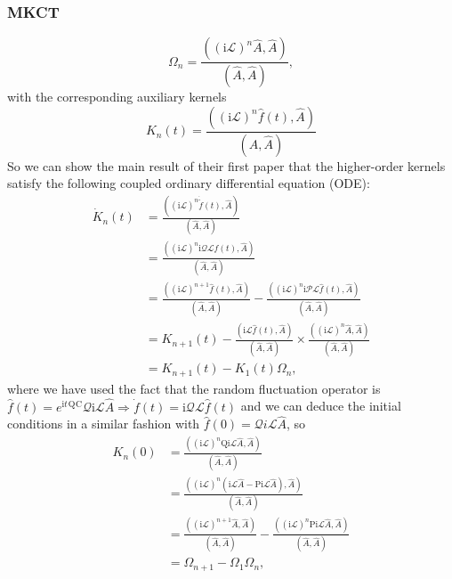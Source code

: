 \subsubsection{MKCT}
\begin{equation}
\Omega_n=\frac{\left((\mathrm{i} \mathcal{L})^n \hat{A}, \hat{A}\right)}{(\hat{A}, \hat{A})},
\end{equation}
with the corresponding auxiliary kernels
\begin{equation}
K_n(t)=\frac{\left((\mathrm{i} \mathcal{L})^n \hat{f}(t), \hat{A}\right)}{(\hat{A}, \hat{A})}
\end{equation}
So we can show the main result of their first paper that the higher-order kernels satisfy the following coupled ordinary differential equation (ODE):
\begin{align}
\dot{K}_n(t) & =\frac{\left((\mathrm{i} \mathcal{L})^n \dot{\tilde{f}}(t), \hat{A}\right)}{(\hat{A}, \hat{A})} \\
& =\frac{\left((\mathrm{i} \mathcal{L})^n \mathrm{i} \mathcal{Q} \mathcal{L} \hat{f}(t), \hat{A}\right)}{(\hat{A}, \hat{A})} \\
& =\frac{\left((\mathrm{i} \mathcal{L})^{n+1} \hat{f}(t), \hat{A}\right)}{(\hat{A}, \hat{A})}-\frac{\left((\mathrm{i} \mathcal{L})^n \mathrm{i} \mathcal{P} \mathcal{L} \hat{f}(t), \hat{A}\right)}{(\hat{A}, \hat{A})} \\
& =K_{n+1}(t)-\frac{(\mathrm{i} \mathcal{L} \hat{f}(t), \hat{A})}{(\hat{A}, \hat{A})} \times \frac{\left((\mathrm{i} \mathcal{L})^n \hat{A}, \hat{A}\right)}{(\hat{A}, \hat{A})} \\
& =K_{n+1}(t)-K_1(t) \Omega_n,
\end{align}
where we have used the fact that the random fluctuation operator is $\hat{f}(t)=e^{\mathrm{i} t}{ }^{\mathrm{Q}}{ }^{\mathrm{C}} \mathcal{Q} \mathrm{i} \mathcal{L} \hat{A} \Longrightarrow \dot{f}(t)=\mathrm{i} \mathcal{Q} \mathcal{L} \hat{f}(t)$ and we can deduce the initial conditions in a similar fashion with $\hat{f}(0)=\mathcal{Q} i \mathcal{L} \hat{A}$, so
\begin{align}
K_n(0) & =\frac{\left((\mathrm{i} \mathcal{L})^n \mathrm{Qi} \mathcal{L} \hat{A}, \hat{A}\right)}{(\hat{A}, \hat{A})} \\
& =\frac{\left((\mathrm{i} \mathcal{L})^n(\mathrm{i} \mathcal{L} \hat{A}-\mathrm{P} \mathrm{i} \mathcal{L} \hat{A}), \hat{A}\right)}{(\hat{A}, \hat{A})} \\
& =\frac{\left((\mathrm{i} \mathcal{L})^{n+1} \hat{A}, \hat{A}\right)}{(\hat{A}, \hat{A})}-\frac{\left((\mathrm{i} \mathcal{L})^n \mathrm{P} \mathrm{i} \mathcal{L} \hat{A}, \hat{A}\right)}{(\hat{A}, \hat{A})} \\
& =\Omega_{n+1}-\Omega_1 \Omega_n,
\end{align}
